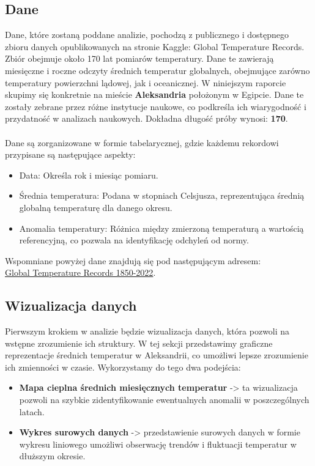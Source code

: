 \documentclass[12pt]{article}
\begin{document}
\subsection{Dane}
Dane, które zostaną poddane analizie, pochodzą z publicznego i dostępnego zbioru danych opublikowanych na stronie Kaggle: Global Temperature Records. Zbiór obejmuje około 170 lat pomiarów temperatury. Dane te zawierają miesięczne i roczne odczyty średnich temperatur globalnych, obejmujące zarówno temperatury powierzchni lądowej, jak i oceanicznej. W niniejszym raporcie skupimy się konkretnie na mieście \textbf{Aleksandria} położonym w Egipcie. Dane te zostały zebrane przez różne instytucje naukowe, co podkreśla ich wiarygodność i przydatność w analizach naukowych. Dokładna długość próby wynosi: \textbf{170}.
\\
\\ Dane są zorganizowane w formie tabelarycznej, gdzie każdemu rekordowi przypisane są następujące aspekty:
\begin{itemize}
    \item Data: Określa rok i miesiąc pomiaru.
    \item Średnia temperatura: Podana w stopniach Celsjusza, reprezentująca średnią globalną temperaturę dla danego okresu.
    \item Anomalia temperatury: Różnica między zmierzoną temperaturą a wartością referencyjną, co pozwala na identyfikację odchyleń od normy.
\end{itemize}
Wspomniane powyżej dane znajdują się pod następującym adresem:
\\ \href{https://www.kaggle.com/datasets/maso0dahmed/global-temperature-records-1850-2022}{Global Temperature Records 1850-2022}.

\subsection{Wizualizacja danych}
Pierwszym krokiem w analizie będzie wizualizacja danych, która pozwoli na wstępne zrozumienie ich struktury. W tej sekcji przedstawimy graficzne reprezentacje średnich temperatur w Aleksandrii, co umożliwi lepsze zrozumienie ich zmienności w czasie. Wykorzystamy do tego dwa podejścia:
\begin{itemize}
    \item \textbf{Mapa cieplna średnich miesięcznych temperatur} -> ta wizualizacja pozwoli na szybkie zidentyfikowanie ewentualnych anomalii w poszczególnych latach.
    \item \textbf{Wykres surowych danych} -> przedstawienie surowych danych w formie wykresu liniowego umożliwi obserwację trendów i fluktuacji temperatur w dłuższym okresie.
\end{itemize}
\end{document}
